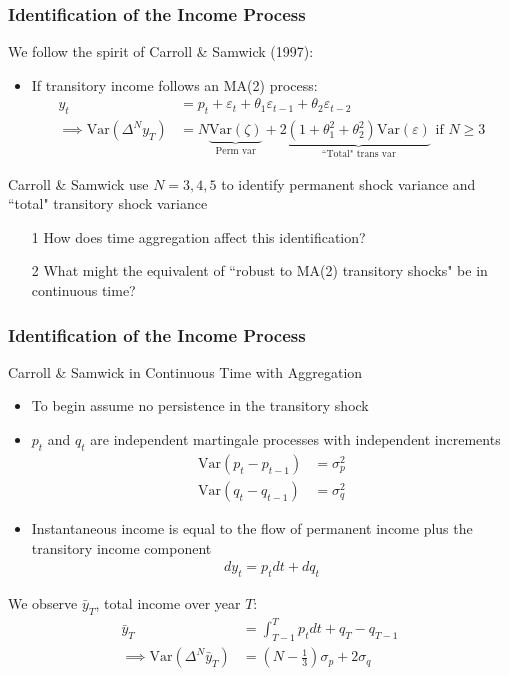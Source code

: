 \documentclass{beamer}
\begin{document}
\frame
{
	\frametitle{Identification of the Income Process}
	We follow the spirit of Carroll \& Samwick (1997):\\
	\begin{itemize}
		\item If transitory income follows an MA(2) process:
		\begin{align*}
			y_t &= p_t + \varepsilon_t + \theta_1 \varepsilon_{t-1} +\theta_2 \varepsilon_{t-2} \\
			\implies \mathrm{Var}(\Delta^N y_T) &= N\underbrace{\mathrm{Var}(\zeta)}_{\text{Perm var}} + 2\underbrace{(1+\theta_1^2+\theta_2^2)\mathrm{Var}(\varepsilon)}_{\text{``Total" trans var}} \text{ if } N\geq 3
		\end{align*}
	\end{itemize}
	Carroll \& Samwick use $N=3,4,5$ to identify permanent shock variance and ``total" transitory shock variance
	\bigskip
	\pause
	\begin{itemize}
		\item[1] How does time aggregation affect this identification?
		\item[2] What might the equivalent of ``robust to MA(2) transitory shocks" be in continuous time?
	\end{itemize}
}
\frame
{
	\frametitle{Identification of the Income Process}
	Carroll \& Samwick in Continuous Time with Aggregation\\
	\begin{itemize}
		\item To begin assume no persistence in the transitory shock
		\item $p_t$ and $q_t$ are independent martingale processes with independent increments
		\begin{align*}
			\mathrm{Var}(p_t-p_{t-1}) &= \sigma^2_p \\
			\mathrm{Var}(q_t-q_{t-1}) &= \sigma^2_q
		\end{align*}
		\item Instantaneous income is equal to the flow of permanent income plus the transitory income component
		\begin{align*}
		dy_t = p_t dt + dq_t
		\end{align*}
	\end{itemize}
	\pause
	We observe $\bar{y}_T$, total income over year $T$:
	\begin{align*}
	\bar{y}_T &= \int_{T-1}^{T}p_t dt + q_T - q_{T-1} \\
	\implies  \mathrm{Var}(\Delta^N \bar{y}_T) &= (N-\frac{1}{3})\sigma_p + 2\sigma_q
	\end{align*}
}
\end{document}
